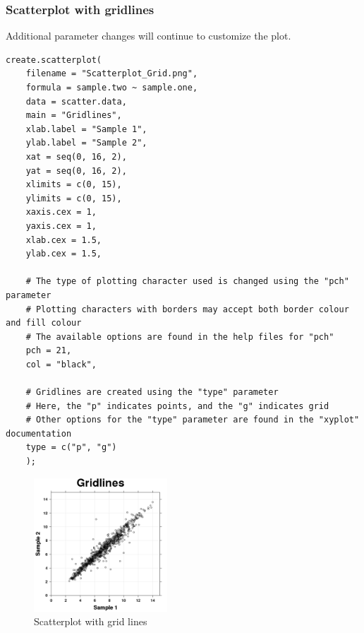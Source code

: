 \documentclass[letterpaper]{article}
\begin{document}
\subsubsection{Scatterplot with gridlines}
Additional parameter changes will continue to customize the plot.
\begin{verbatim}
create.scatterplot(
    filename = "Scatterplot_Grid.png",
    formula = sample.two ~ sample.one,
    data = scatter.data,
    main = "Gridlines",
    xlab.label = "Sample 1",
    ylab.label = "Sample 2",
    xat = seq(0, 16, 2),
    yat = seq(0, 16, 2),
    xlimits = c(0, 15),
    ylimits = c(0, 15),
    xaxis.cex = 1,
    yaxis.cex = 1,
    xlab.cex = 1.5,
    ylab.cex = 1.5,
    
    # The type of plotting character used is changed using the "pch" parameter
    # Plotting characters with borders may accept both border colour and fill colour
    # The available options are found in the help files for "pch"
    pch = 21,
    col = "black",
    
    # Gridlines are created using the "type" parameter
    # Here, the "p" indicates points, and the "g" indicates grid
    # Other options for the "type" parameter are found in the "xyplot" documentation
    type = c("p", "g")
    );
\end{verbatim}
\begin{figure}[!ht]
  \begin{center}
     \includegraphics[width=50mm]{Figures/Scatterplot_Grid.png}
     \caption{Scatterplot with grid lines}
  \end{center}
\end{figure}
\end{document}

